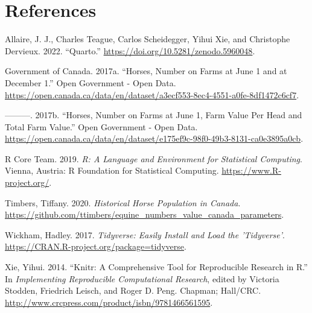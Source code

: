\documentclass[
  letterpaper,
  DIV=11,
  numbers=noendperiod]{scrartcl}
\newlength{\cslhangindent}
\newenvironment{CSLReferences}[2] %
 {\begin{list}{}{%
  \setlength{\itemindent}{0pt}
  \setlength{\leftmargin}{0pt}
  \setlength{\parsep}{0pt}
  \ifodd #1
   \setlength{\leftmargin}{\cslhangindent}
   \setlength{\itemindent}{-1\cslhangindent}
  \fi
  \setlength{\itemsep}{#2\baselineskip}}}
 {\end{list}}
\begin{document}
\section*{References}\label{references}

\label{refs}
\begin{CSLReferences}{1}{0}
Allaire, J. J., Charles Teague, Carlos Scheidegger, Yihui Xie, and
Christophe Dervieux. 2022. {``{Quarto}.''}
\url{https://doi.org/10.5281/zenodo.5960048}.

Government of Canada. 2017a. {``Horses, Number on Farms at June 1 and at
December 1.''} Open Government - Open Data.
\url{https://open.canada.ca/data/en/dataset/a3ecf553-8ec4-4551-a0fe-8df1472c6cf7}.

---------. 2017b. {``Horses, Number on Farms at June 1, Farm Value Per
Head and Total Farm Value.''} Open Government - Open Data.
\url{https://open.canada.ca/data/en/dataset/e175ef9c-98f0-49b3-8131-ca0e3895a0cb}.

R Core Team. 2019. \emph{R: A Language and Environment for Statistical
Computing}. Vienna, Austria: R Foundation for Statistical Computing.
\url{https://www.R-project.org/}.

Timbers, Tiffany. 2020. \emph{Historical Horse Population in Canada}.
\url{https://github.com/ttimbers/equine_numbers_value_canada_parameters}.

Wickham, Hadley. 2017. \emph{Tidyverse: Easily Install and Load the
'Tidyverse'}. \url{https://CRAN.R-project.org/package=tidyverse}.

Xie, Yihui. 2014. {``Knitr: A Comprehensive Tool for Reproducible
Research in {R}.''} In \emph{Implementing Reproducible Computational
Research}, edited by Victoria Stodden, Friedrich Leisch, and Roger D.
Peng. Chapman; Hall/CRC.
\url{http://www.crcpress.com/product/isbn/9781466561595}.

\end{CSLReferences}
\end{document}

